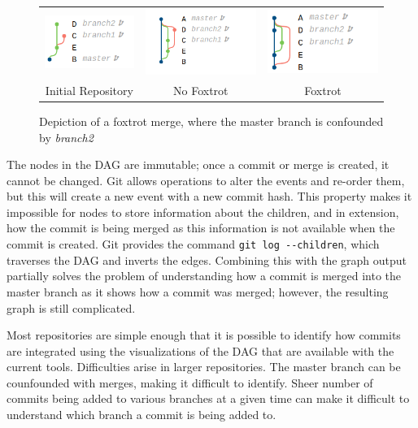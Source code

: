 \begin{figure}[htpb]
  \centering
  \begin{tabular}{ccc}
    \includegraphics[width=114px]{Figures/background/foxtrot_initial.png} &
    \includegraphics[width=145px]{Figures/background/foxtrot_good.png} &
    \includegraphics[width=145px]{Figures/background/foxtrot_bad.png} \\
    Initial Repository & No Foxtrot & Foxtrot
  \end{tabular}
  \caption{Depiction of a foxtrot merge, where the master branch is
    confounded by \emph{branch2}}
  \label{fig:foxtrot_steps}
\end{figure}

The nodes in the DAG are immutable; once a commit or merge is created,
it cannot be changed. Git allows operations to alter the events and
re-order them, but this will create a new event with a new commit hash.
This property makes it impossible for nodes to store information about
the children, and in extension, how the commit is being merged as this
information is not available when the commit is created. Git provides
the command \verb|git log --children|, which traverses the DAG and
inverts the edges. Combining this with the graph output partially solves
the problem of understanding how a commit is merged into the master
branch as it shows how a commit was merged; however, the resulting graph
is still complicated.

Most repositories are simple enough that it is possible to identify how
commits are integrated using the visualizations of the DAG that are
available with the current tools. Difficulties arise in larger
repositories. The master branch can be counfounded with \foxtrot{}
merges, making it difficult to identify. Sheer number of commits being
added to various branches at a given time can make it difficult to
understand which branch a commit is being added to.

